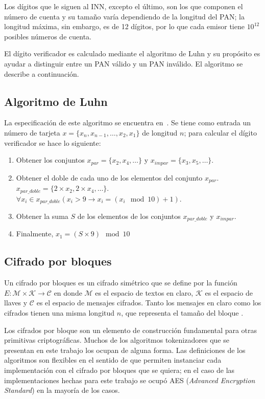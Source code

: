 Los dígitos que le siguen al INN, excepto el último, son los que componen el
número de cuenta y su tamaño varía dependiendo de la longitud del PAN; la
longitud máxima, sin embargo, es de 12 dígitos, por lo que cada emisor tiene
$10^{12}$ posibles números de cuenta.

El dígito verificador es calculado mediante el algoritmo de Luhn y su
propósito es ayudar a distinguir entre un PAN válido y un PAN inválido.
El algoritmo se describe a continuación.

\subsection{Algoritmo de Luhn}

La especificación de este algoritmo se encuentra en~\cite{iso_7812}. Se tiene
como entrada un número de tarjeta $ x = \{x_n, x_{n-1}, \dots, x_2, x_1\}$ de
longitud $ n $; para calcular el dígito verificador se hace lo siguiente:
\begin{enumerate}
  \item Obtener los conjuntos $x_{par} = \{x_2, x_4, \dots\}$ y
    $x_{impar} = \{x_3, x_5, \dots\}$.
  \item Obtener el doble de cada uno de los elementos del conjunto $x_{par}$.
    $x_{par\_doble} = \{2 \times x_2, 2 \times x_4, \dots\}$.
    $\forall x_i \in x_{par\_doble} (x_i > 9 \rightarrow
    x_i = (x_i \mod 10) + 1)$.
  \item Obtener la suma $ S $ de los elementos de los conjuntos $x_{par\_doble}$
    y $x_{impar}$.
  \item Finalmente, $x_1 = (S \times 9) \mod 10$
\end{enumerate}

\subsection{Cifrado por bloques}

Un cifrado por bloques es un cifrado simétrico que se define por la función $ E:
\mathcal{M} \times \mathcal{K} \rightarrow \mathcal{C} $ en donde $ \mathcal{M} $
es el espacio de textos en claro, $ \mathcal{K} $ es el espacio de llaves y $
\mathcal{C} $ es el espacio de mensajes cifrados. Tanto los mensajes en claro
como los cifrados tienen una misma longitud $ n $, que representa el tamaño del
bloque \cite{menezes}.

Los cifrados por bloque son un elemento de construcción fundamental para otras
primitivas criptográficas. Muchos de los algoritmos tokenizadores que se
presentan en este trabajo los ocupan de alguna forma. Las definiciones de los
algoritmos son flexibles en el sentido de que permiten instanciar cada
implementación con el cifrado por bloques que se quiera; en el caso de las
implementaciones hechas para este trabajo se ocupó AES (\textit{Advanced
Encryption Standard}) en la mayoría de los casos.

